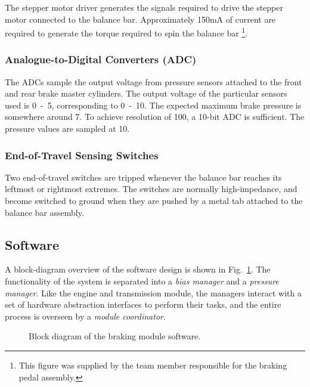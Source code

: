 The stepper motor driver generates the signals required to drive the stepper motor connected to the balance bar. Approximately \unit{150}{mA} of current are required to generate the torque required to spin the balance bar \footnote{This figure was supplied by the team member responsible for the braking pedal assembly.}.

\subsubsection{Analogue-to-Digital Converters (ADC)}

The ADCs sample the output voltage from pressure sensors attached to the front and rear brake master cylinders. The output voltage of the particular sensors used is \unit{0-5}{\volt}, corresponding to \unit{0-10}{\mega\pascal}. The expected maximum brake pressure is somewhere around \unit{7}{\mega\pascal}. To achieve resolution of \unit{100}{\kilo\pascal}, a 10-bit ADC is sufficient. The pressure values are sampled at \unit{10}{\hertz}.

\subsubsection{End-of-Travel Sensing Switches}

Two end-of-travel switches are tripped whenever the balance bar reaches its leftmost or rightmost extremes. The switches are normally high-impedance, and become switched to ground when they are pushed by a metal tab attached to the balance bar assembly. 

\subsection{Software}

A block-diagram overview of the software design is shown in Fig.\ \ref{fig:brake_software_design_block}. The functionality of the system is separated into a \emph{bias manager} and a \emph{pressure manager}. Like the engine and transmission module, the managers interact with a set of hardware abstraction interfaces to perform their tasks, and the entire process is overseen by a \emph{module coordinator}.

\begin{figure}[H]
	\centering
	
	\caption{Block diagram of the braking module software.}
	\label{fig:brake_software_design_block}
\end{figure}

